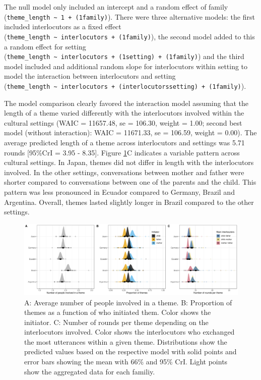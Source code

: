 \documentclass[
  man,floatsintext]{apa6}
\begin{document}
The null model only included an intercept and a random effect of family (\texttt{theme\_length\ \textasciitilde{}\ 1\ +\ (1\textbar{}family)}). There were three alternative models: the first included interlocutors as a fixed effect (\texttt{theme\_length\ \textasciitilde{}\ interlocutors\ +\ (1\textbar{}family)}), the second model added to this a random effect for setting (\texttt{theme\_length\ \textasciitilde{}\ interlocutors\ +\ (1\textbar{}setting)\ +\ (1\textbar{}family)}) and the third model included and additional random slope for interlocutors within setting to model the interaction between interlocutors and setting (\texttt{theme\_length\ \textasciitilde{}\ interlocutors\ +\ (interlocutors\textbar{}setting)\ +\ (1\textbar{}family)}).

The model comparison clearly favored the interaction model assuming that the length of a theme varied differently with the interlocutors involved within the cultural settings (WAIC = 11657.48, se = 106.30, weight = 1.00; second best model (without interaction): WAIC = 11671.33, se = 106.59, weight = 0.00). The average predicted length of a theme across interlocutors and settings was 5.71 rounds {[}95\%CrI = 3.95 - 8.35{]}. Figure \ref{fig:fig3}C indicates a variable pattern across cultural settings. In Japan, themes did not differ in length with the interlocutors involved. In the other settings, conversations between mother and father were shorter compared to conversations between one of the parents and the child. This pattern was less pronounced in Ecuador compared to Germany, Brazil and Argentina. Overall, themes lasted slightly longer in Brazil compared to the other settings.

\begin{figure}
\includegraphics[width=1\linewidth]{../visuals/fig3} \caption{A: Average number of people involved in a theme. B: Proportion of themes as a function of who initiated them. Color shows the initiator. C: Number of rounds per theme depending on the interlocutors involved. Color shows the interlocutors who exchanged the most utterances within a given theme. Distributions show the predicted values based on the respective model with solid points and error bars showing the mean with 66\% and 95\% CrI. Light points show the aggregated data for each familiy.}\label{fig:fig3}
\end{figure}
\end{document}
